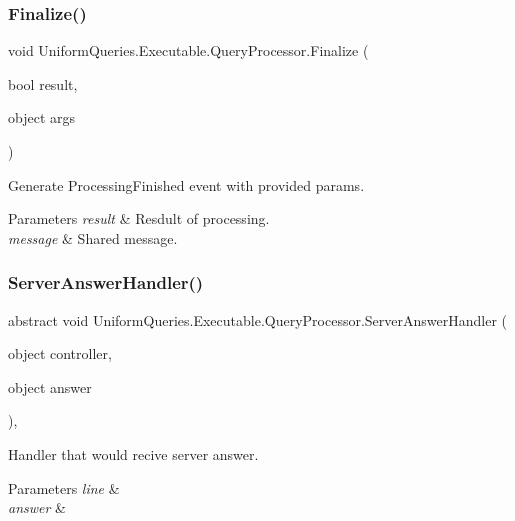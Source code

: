 \subsubsection{\texorpdfstring{Finalize()}{Finalize()}}
{\footnotesize\ttfamily void Uniform\+Queries.\+Executable.\+Query\+Processor.\+Finalize (\begin{DoxyParamCaption}\item[{bool}]{result,  }\item[{object}]{args }\end{DoxyParamCaption})\hspace{0.3cm}{\ttfamily [protected]}}



Generate Processing\+Finished event with provided params. 


\begin{DoxyParams}{Parameters}
{\em result} & Resdult of processing.\\
\hline
{\em message} & Shared message.\\
\hline
\end{DoxyParams}
\mbox{\label{class_uniform_queries_1_1_executable_1_1_query_processor_a4597c1035fc6bb96f9285cb666655a53}} 
\subsubsection{\texorpdfstring{Server\+Answer\+Handler()}{ServerAnswerHandler()}}
{\footnotesize\ttfamily abstract void Uniform\+Queries.\+Executable.\+Query\+Processor.\+Server\+Answer\+Handler (\begin{DoxyParamCaption}\item[{object}]{controller,  }\item[{object}]{answer }\end{DoxyParamCaption})\hspace{0.3cm}{\ttfamily [protected]}, {}}



Handler that would recive server answer. 


\begin{DoxyParams}{Parameters}
{\em line} & \\
\hline
{\em answer} & \\
\hline
\end{DoxyParams}


